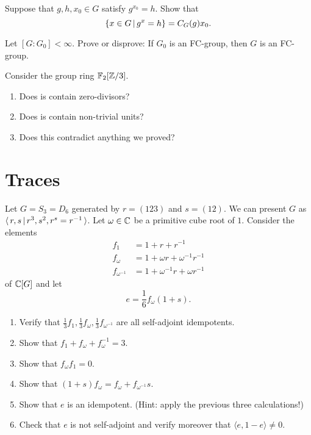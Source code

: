 \begin{exercise}
    Suppose that $g, h, x_0 \in G$ satisfy $g^{x_0} = h$.
    Show that \[
        \left\{ x \in G \,\middle|\, g^x = h \right\} = C_G(g) x_0.
    \]
\end{exercise}

\begin{exercise}
    Let $[G : G_0] < \infty$.
    Prove or disprove: If $G_0$ is an FC-group, then $G$ is an FC-group.
\end{exercise}

\begin{exercise}
    Consider the group ring $\mathbb{F}_2[\mathbb{Z}/3]$.
    \begin{enumerate}
        \item Does is contain zero-divisors?
        \item Does is contain non-trivial units?
        \item Does this contradict anything we proved?
    \end{enumerate}
\end{exercise}


\section{Traces}

\begin{exercise}
    Let $G = S_3 = D_6$ generated by $r = (1 2 3)$ and $s = (1 2)$.
    We can present $G$ as $\langle \, r, s \, | \, r^3, s^2, r^s = r^{-1} \, \rangle$.
    Let $\omega \in \mathbb{C}$ be a primitive cube root of $1$.
    Consider the elements
    \begin{align*}
        f_1 &= 1 + r + r^{-1} \\
        f_\omega &= 1 + \omega r + \omega^{-1} r^{-1} \\
        f_{\omega^{-1}} &= 1 + \omega^{-1} r + \omega r^{-1}
    \end{align*}
    of $\mathbb{C}[G]$ and let \[
        e = \frac{1}{6} f_\omega (1 + s).
    \]
    \begin{enumerate}
        \item Verify that $\frac{1}{3} f_1, \frac{1}{3} f_\omega, \frac{1}{3} f_{\omega^{-1}}$ are all self-adjoint idempotents.
        \item Show that $f_1 + f_\omega + f_\omega^{-1} = 3$.
        \item Show that $f_\omega f_1 = 0$.
        \item Show that $(1 + s) f_\omega = f_\omega + f_{\omega^{-1}} s$.
        \item Show that $e$ is an idempotent. (Hint: apply the previous three calculations!)
        \item Check that $e$ is not self-adjoint and verify moreover that $\langle e, 1 - e \rangle \neq 0$.
    \end{enumerate}
\end{exercise}

